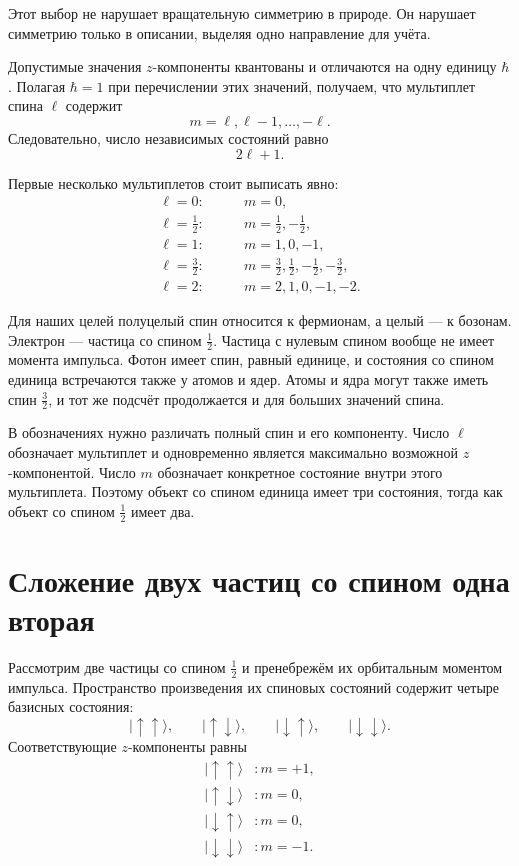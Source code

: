 Этот выбор не нарушает вращательную симметрию в природе. Он нарушает симметрию только в описании, выделяя одно направление для учёта.

Допустимые значения \(z\)-компоненты квантованы и отличаются на одну единицу \(\hbar\). Полагая \(\hbar=1\) при перечислении этих значений, получаем, что мультиплет спина \(\ell\) содержит
\begin{equation}
m=\ell,\ell-1,\ldots,-\ell.
\end{equation}
Следовательно, число независимых состояний равно
\begin{equation}
2\ell+1.
\end{equation}

Первые несколько мультиплетов стоит выписать явно:
\begin{align}
\ell=0:&\qquad m=0,\\
\ell=\frac12:&\qquad m=\frac12,-\frac12,\\
\ell=1:&\qquad m=1,0,-1,\\
\ell=\frac32:&\qquad
m=\frac32,\frac12,-\frac12,-\frac32,\\
\ell=2:&\qquad m=2,1,0,-1,-2.
\end{align}

Для наших целей полуцелый спин относится к фермионам, а целый — к бозонам. Электрон — частица со спином \(\tfrac12\). Частица с нулевым спином вообще не имеет момента импульса. Фотон имеет спин, равный единице, и состояния со спином единица встречаются также у атомов и ядер. Атомы и ядра могут также иметь спин \(\tfrac32\), и тот же подсчёт продолжается и для больших значений спина.

В обозначениях нужно различать полный спин и его компоненту. Число \(\ell\) обозначает мультиплет и одновременно является максимально возможной \(z\)-компонентой. Число \(m\) обозначает конкретное состояние внутри этого мультиплета. Поэтому объект со спином единица имеет три состояния, тогда как объект со спином \(\tfrac12\) имеет два.

\section{Сложение двух частиц со спином одна вторая}

Рассмотрим две частицы со спином \(\tfrac12\) и пренебрежём их орбитальным моментом импульса. Пространство произведения их спиновых состояний содержит четыре базисных состояния:
\begin{equation}
|\uparrow\uparrow\rangle,\qquad
|\uparrow\downarrow\rangle,\qquad
|\downarrow\uparrow\rangle,\qquad
|\downarrow\downarrow\rangle.
\end{equation}
Соответствующие \(z\)-компоненты равны
\begin{align}
|\uparrow\uparrow\rangle &: m=+1,\\
|\uparrow\downarrow\rangle &: m=0,\\
|\downarrow\uparrow\rangle &: m=0,\\
|\downarrow\downarrow\rangle &: m=-1.
\end{align}

